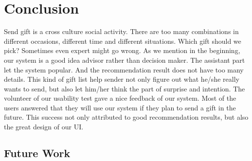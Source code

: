 \documentclass[11pt,twocolumn]{article}
\begin{document}


\section{Conclusion}

Send gift is a cross culture social activity.  There are too many combinations in different occasions, different time and different situations.   Which gift should we pick?   Sometimes even expert might go wrong.   
As we mention in the beginning, our system is a good idea advisor rather than decision maker.   The assistant part let the system popular.   And the recommendation result does not have too many details. This kind of gift list help sender not only figure out what he/she really wants to send, but also let him/her think the part of surprise and intention.
The volunteer of our usability test gave a nice feedback of our system.   Most of the users answered that they will use our system if they plan to send a gift in the future.   This success not only attributed to good recommendation results, but also the great design of our UI.

\subsection{Future Work}
\end{document}
